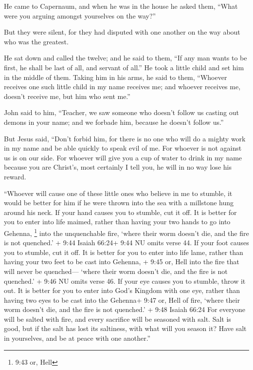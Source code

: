  He came to Capernaum, and when he was in the house he
asked them, ``What were you arguing amongst yourselves on the way?''

 But they were silent, for they had disputed with one
another on the way about who was the greatest.

 He sat down and called the twelve; and he said to them,
``If any man wants to be first, he shall be last of all, and servant of
all.''  He took a little child and set him in the middle of
them. Taking him in his arms, he said to them,  ``Whoever
receives one such little child in my name receives me; and whoever
receives me, doesn't receive me, but him who sent me.''

 John said to him, ``Teacher, we saw someone who doesn't
follow us casting out demons in your name; and we forbade him, because
he doesn't follow us.''

 But Jesus said, ``Don't forbid him, for there is no one
who will do a mighty work in my name and be able quickly to speak evil
of me.  For whoever is not against us is on our side.
 For whoever will give you a cup of water to drink in my
name because you are Christ's, most certainly I tell you, he will in no
way lose his reward.

 ``Whoever will cause one of these little ones who believe
in me to stumble, it would be better for him if he were thrown into the
sea with a millstone hung around his neck.  If your hand
causes you to stumble, cut it off. It is better for you to enter into
life maimed, rather than having your two hands to go into Gehenna,
\footnote{9:43 or, Hell} into the unquenchable fire, 
`where their worm doesn't die, and the fire is not quenched.' + 9:44
Isaiah 66:24+ 9:44 NU omits verse 44.  If your foot causes
you to stumble, cut it off. It is better for you to enter into life
lame, rather than having your two feet to be cast into Gehenna, + 9:45
or, Hell into the fire that will never be quenched--- 
`where their worm doesn't die, and the fire is not quenched.' + 9:46 NU
omits verse 46.  If your eye causes you to stumble, throw
it out. It is better for you to enter into God's Kingdom with one eye,
rather than having two eyes to be cast into the Gehenna+ 9:47 or, Hell
of fire,  `where their worm doesn't die, and the fire is
not quenched.' + 9:48 Isaiah 66:24  For everyone will be
salted with fire, and every sacrifice will be seasoned with salt.
 Salt is good, but if the salt has lost its saltiness, with
what will you season it? Have salt in yourselves, and be at peace with
one another.''

